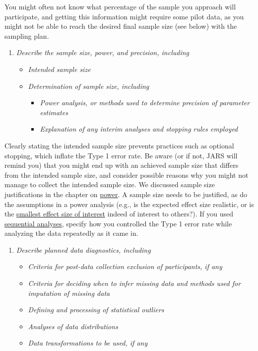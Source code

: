 \documentclass[
  oneside]{krantz}
\providecommand{\tightlist}{%
  \setlength{\itemsep}{0pt}\setlength{\parskip}{0pt}}
\begin{document}
You might often not know what percentage of the sample you approach will participate, and getting this information might require some pilot data, as you might not be able to reach the desired final sample size (see below) with the sampling plan.

\begin{enumerate}
\def\labelenumi{\arabic{enumi}.}
\setcounter{enumi}{3}
\tightlist
\item
  \emph{Describe the sample size, power, and precision, including}

  \begin{itemize}
  \tightlist
  \item
    \emph{Intended sample size}
  \item
    \emph{Determination of sample size, including}

    \begin{itemize}
    \tightlist
    \item
      \emph{Power analysis, or methods used to determine precision of parameter estimates}
    \item
      \emph{Explanation of any interim analyses and stopping rules employed}
    \end{itemize}
  \end{itemize}
\end{enumerate}

Clearly stating the intended sample size prevents practices such as optional stopping, which inflate the Type 1 error rate. Be aware (or if not, JARS will remind you) that you might end up with an achieved sample size that differs from the intended sample size, and consider possible reasons why you might not manage to collect the intended sample size. We discussed sample size justifications in the chapter on \protect\hyperlink{power}{power}. A sample size needs to be justified, as do the assumptions in a power analysis (e.g., is the expected effect size realistic, or is the \protect\hyperlink{sesoi}{smallest effect size of interest} indeed of interest to others?). If you used \protect\hyperlink{sequential}{sequential analyses}, specify how you controlled the Type 1 error rate while analyzing the data repeatedly as it came in.

\begin{enumerate}
\def\labelenumi{\arabic{enumi}.}
\setcounter{enumi}{4}
\tightlist
\item
  \emph{Describe planned data diagnostics, including}

  \begin{itemize}
  \tightlist
  \item
    \emph{Criteria for post-data collection exclusion of participants, if any}
  \item
    \emph{Criteria for deciding when to infer missing data and methods used for imputation of missing data}
  \item
    \emph{Defining and processing of statistical outliers}
  \item
    \emph{Analyses of data distributions}
  \item
    \emph{Data transformations to be used, if any}
  \end{itemize}
\end{enumerate}
\end{document}
